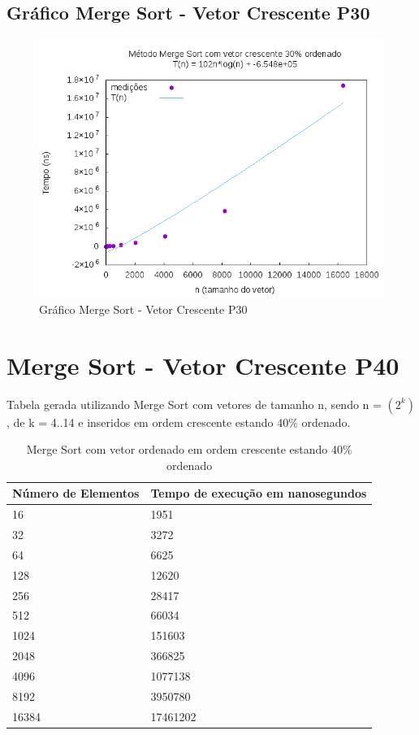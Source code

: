 \documentclass[12pt,a4paper,twoside]{report}
\begin{document}
\subsection{Gráfico Merge Sort - Vetor Crescente P30}
\begin{figure}[H]
    \centering
    \includegraphics[width=0.7\linewidth]{graficos/MergeSort/vIntCrescenteP30/vIntCrescenteP30.png}
  \caption{Gráfico Merge Sort - Vetor Crescente P30}
\end{figure}

\section{Merge Sort - Vetor Crescente P40}
Tabela gerada utilizando Merge Sort com vetores de tamanho n, sendo n = $(2^k)$, de k = 4..14 e inseridos em ordem crescente estando 40\% ordenado.
\begin{table}[H]
\centering
\caption{Merge Sort com vetor ordenado em ordem crescente estando 40\% ordenado}
\label{my-label}
\begin{tabular}{|l|l|}
\hline
\multicolumn{1}{|c|}{\textbf{Número de Elementos}} & \multicolumn{1}{c|}{\textbf{Tempo de execução em nanosegundos}} \\ \hline
16 & 1951 \\ \hline
32 & 3272 \\ \hline
64 & 6625 \\ \hline
128 & 12620 \\ \hline
256 & 28417 \\ \hline
512 & 66034 \\ \hline
1024 & 151603 \\ \hline
2048 & 366825 \\ \hline
4096 & 1077138 \\ \hline
8192 & 3950780 \\ \hline
16384 & 17461202 \\ \hline
\end{tabular}
\end{table}
\end{document}
